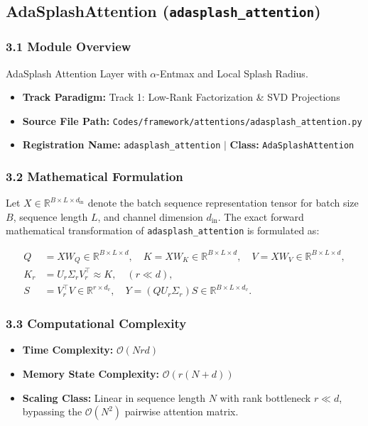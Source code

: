 \subsection{AdaSplashAttention (\texttt{adasplash\_attention})}
\label{sec:app_module_adasplash_attention}

\subsubsection*{3.1 Module Overview}
AdaSplash Attention Layer with $\alpha$-Entmax and Local Splash Radius.
\begin{itemize}
    \item \textbf{Track Paradigm:} Track 1: Low-Rank Factorization \& SVD Projections
    \item \textbf{Source File Path:} \texttt{Codes/framework/attentions/adasplash\_attention.py}
    \item \textbf{Registration Name:} \texttt{adasplash\_attention} $\mid$ \textbf{Class:} \texttt{AdaSplashAttention}
\end{itemize}

\subsubsection*{3.2 Mathematical Formulation}
Let $X \in \mathbb{R}^{B \times L \times d_{\text{in}}}$ denote the batch sequence representation tensor for batch size $B$, sequence length $L$, and channel dimension $d_{\text{in}}$. The exact forward mathematical transformation of \texttt{adasplash\_attention} is formulated as:

\begin{align}
Q &= X W_Q \in \mathbb{R}^{B \times L \times d}, \quad K = X W_K \in \mathbb{R}^{B \times L \times d}, \quad V = X W_V \in \mathbb{R}^{B \times L \times d}, \\
K_r &= U_r \Sigma_r V_r^\top \approx K, \quad (r \ll d), \\
S &= V_r^\top V \in \mathbb{R}^{r \times d_v}, \quad Y = (Q U_r \Sigma_r) S \in \mathbb{R}^{B \times L \times d_v}.
\end{align}


\subsubsection*{3.3 Computational Complexity}
\begin{itemize}
    \item \textbf{Time Complexity:} $\mathcal{O}(N r d)$
    \item \textbf{Memory State Complexity:} $\mathcal{O}(r(N + d))$
    \item \textbf{Scaling Class:} Linear in sequence length $N$ with rank bottleneck $r \ll d$, bypassing the $\mathcal{O}(N^2)$ pairwise attention matrix.
\end{itemize}

